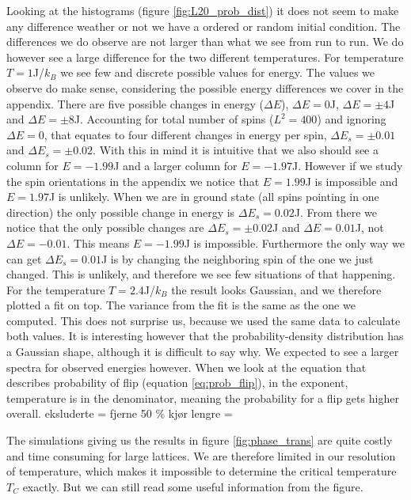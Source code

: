 \documentclass[reprint, english,notitlepage,nofootinbib]{revtex4-1}  %
\begin{document}
Looking at the histograms (figure \ref{fig:L20_prob_dist}) it does not seem to make any difference weather or not we have a ordered or random initial condition. The differences we do observe are not larger than what we see from run to run. We do however see a large difference for the two different temperatures. For temperature $T = 1$J/$k_B$ we see few and discrete possible values for energy. The values we observe do make sense, considering the possible energy differences we cover in the appendix. There are five possible changes in energy ($\Delta E$), $\Delta E = 0$J, $\Delta E = \pm 4$J and $\Delta E = \pm8$J. Accounting for total number of spins ($L^2 = 400$) and ignoring $\Delta E = 0$, that equates to four different changes in energy per spin, $\Delta E_s = \pm0.01$ and $\Delta E_s = \pm0.02$. With this in mind it is intuitive that we also should see a column for $E = -1.99$J and a larger column for $E = -1.97$J. However if we study the spin orientations in the appendix we notice that $E=1.99$J is impossible and $E = 1.97$J is unlikely. When we are in ground state (all spins pointing in one direction) the only possible change in energy is $\Delta E_s=0.02$J. From there we notice that the only possible changes are $\Delta E_s = \pm 0.02$J and $\Delta E = 0.01$J, not $\Delta E = -0.01$. This means $E = -1.99$J is impossible. Furthermore the only way we can get $\Delta E_s=0.01$J is by changing the neighboring spin of the one we just changed. This is unlikely, and therefore we see few situations of that happening. For the temperature $T = 2.4$J/$k_B$ the result looks Gaussian, and we therefore plotted a fit on top. The variance from the fit is the same as the one we computed. This does not surprise us, because we used the same data to calculate both values. It is interesting however that the probability-density distribution has a Gaussian shape, although it is difficult to say why. We expected to see a larger spectra for observed energies however. When we look at the equation that describes probability of flip (equation \eqref{eq:prob_flip}), in the exponent, temperature is in the denominator, meaning the probability for a flip gets higher overall.
eksluderte = fjerne 50 \%
kjør lengre =

The simulations giving us the results in figure \ref{fig:phase_trans} are quite costly and time consuming for large lattices. We are therefore limited in our resolution of temperature, which makes it impossible to determine the critical temperature $T_C$ exactly. But we can still read some useful information from the figure.
\end{document}

